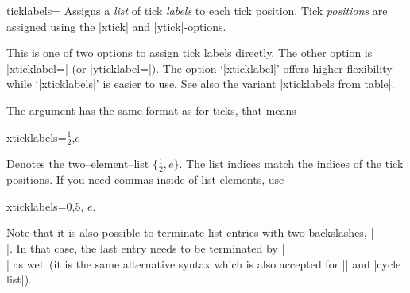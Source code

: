 \begin{pgfplotsxykey}{\x ticklabels=}
\label{pgfplots:key:xticklabels}%
Assigns a \emph{list} of tick \emph{labels} to each tick position. Tick \emph{positions} are assigned using the |xtick| and |ytick|-options.

This is one of two options to assign tick labels directly. The other option is |xticklabel=| (or |yticklabel=|).
The option `|xticklabel|' offers higher flexibility while `|xticklabels|' is easier to use. See also the variant |xticklabels from table|.

The argument  has the same format as for ticks, that means
\begin{codeexample}
xticklabels={$\frac{1}{2}$,$e$}
\end{codeexample}
Denotes the two--element--list $\{\frac 12, e\}$. The list indices match the indices of the tick positions. If you need commas inside of list elements, use 
\begin{codeexample}
xticklabels={{0,5}, $e$}.
\end{codeexample}


\begin{codeexample}[]
\end{codeexample}

\begin{codeexample}[]
\end{codeexample}

	Note that it is also possible to terminate list entries with two backslashes, |\\|. In that case, the last entry needs to be terminated by |\\| as well (it is the same alternative syntax which is also accepted for |\legend| and |cycle list|).
\end{pgfplotsxykey}


